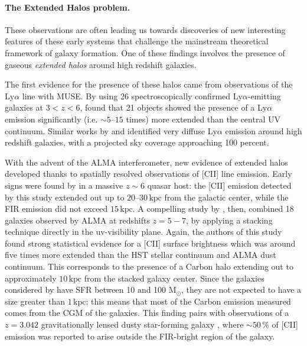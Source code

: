 \documentclass[12pt]{article}
\begin{document}
\paragraph{The Extended Halos problem.} These observations are often leading us towards discoveries of new interesting features of these early systems that challenge the mainstream theoretical framework of galaxy formation. One of these findings involves the presence of gaseous \textit{extended halos} around high redshift galaxies.

The first evidence for the presence of these halos came from observations of the Ly$\alpha$ line with MUSE. By using 26 spectroscopically confirmed Ly$\alpha$-emitting galaxies at $3<z<6$, \citet{Wisotzki16} found that 21 objects showed the presence of a Ly$\alpha$ emission significantly (i.e. $\sim 5–15$ times) more extended than the central UV continuum. Similar works by \citet{Wisotzki18} and \citet{Kakuma19} identified very diffuse Ly$\alpha$ emission around high redshift galaxies, with a projected sky coverage approaching 100 percent.

With the advent of the ALMA interferometer, new evidence of extended halos developed thanks to spatially resolved observations of [CII] line emission. Early signs were found by \citet{cicone2015} in a massive $z\sim6$ quasar host: the [CII] emission detected by this study extended out up to $20–30\,\mathrm{kpc}$ from the galactic center, while the FIR emission did not exceed $15\,\mathrm{kpc}$. A compelling study by \citet{Fujimoto19}, then, combined 18 galaxies observed by ALMA at redshifts $z=5-7$, by applying a stacking technique directly in the uv-visibility plane. Again, the authors of this study found strong statistical evidence for a [CII] surface brightness which was around five times more extended than the HST stellar continuum and ALMA dust continuum. This corresponds to the presence of a Carbon halo extending out to approximately $10\,\mathrm{kpc}$ from the stacked galaxy center. Since the galaxies considered by \cite{Fujimoto19} have SFR between 10 and 100 $\mathrm{M}_\odot$, they are not expected to have a size greater than $1\,\mathrm{kpc}$: this means that most of the Carbon emission measured comes from the CGM of the galaxies. This finding pairs with observations of a $z = 3.042$ gravitationally lensed dusty star-forming galaxy \citep{Rybak20}, where $\sim50\,\%$ of [CII] emission was reported to arise outside the FIR-bright region of the galaxy.
\end{document}
